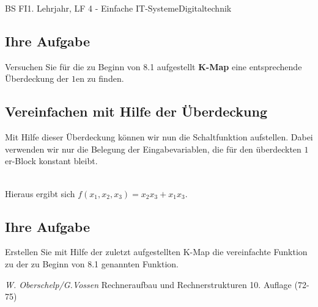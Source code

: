 \documentclass[11pt,twocolumn,oneside,openany,headings=optiontotoc,11pt,numbers=noenddot]{article}
\begin{document}
\begin{worksheet}{BS FI}{1. Lehrjahr, LF 4 - Einfache IT-Systeme}{Digitaltechnik}
		\subsection*{Ihre Aufgabe} Versuchen Sie für die zu Beginn von 8.1 aufgestellt \textbf{K-Map} eine entsprechende Überdeckung der \(1\)en zu finden.\\
		\subsection{Vereinfachen mit Hilfe der Überdeckung}
		Mit Hilfe dieser Überdeckung können wir nun die Schaltfunktion aufstellen. Dabei verwenden wir nur die Belegung der Eingabevariablen, die für den überdeckten \(1\)er-Block konstant bleibt.
		\begin{karnaugh-map}[4][2][1][$x_2x_3$][$x_1$]
		\end{karnaugh-map}\\
		Hieraus ergibt sich \(f(x_1,x_2,x_3) = x_2x_3 + x_1x_3\).\\
		\subsection*{Ihre Aufgabe} Erstellen Sie mit Hilfe der zuletzt aufgestellten K-Map die vereinfachte Funktion zu der zu Beginn von 8.1 genannten Funktion.\\
		\par\bigskip\noindent
		\tiny{\color{codegray}\textit{W. Oberschelp/G.Vossen} Rechneraufbau und Rechnerstrukturen 10. Auflage (72-75)}
	\end{worksheet}
\end{document}
